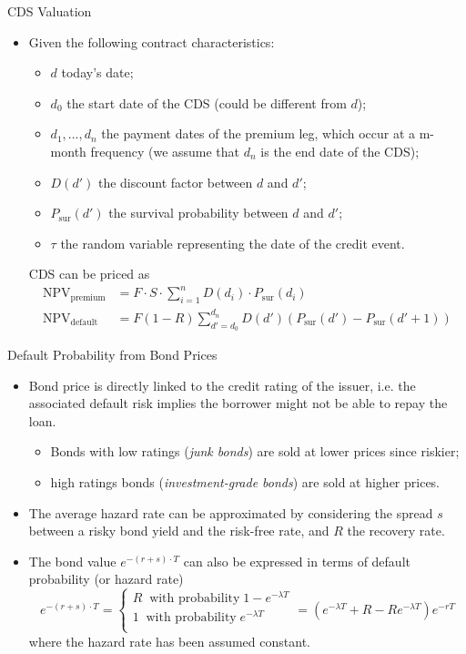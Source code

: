 \documentclass{beamer}
\begin{document}
\begin{frame}{CDS Valuation}
\begin{itemize}
\item Given the following contract characteristics:
\begin{itemize}
\item $d$ today's date;
\item $d_0$ the start date of the CDS (could be different from $d$);
\item $d_1, ..., d_n$ the payment dates of the premium leg, which occur at a m-month frequency (we assume that $d_n$ is the end date of the CDS);
\item $D(d')$ the discount factor between $d$ and $d'$;
\item $P_{\textrm{sur}}(d')$ the survival probability between $d$ and $d'$;
\item $\tau$ the random variable representing the date of the credit event.
\end{itemize}
CDS can be priced as
\begin{align*}
\textrm{NPV}_{\textrm{premium}} &= F\cdot S\cdot \sum_{i=1}^{n} D(d_i) \cdot P_{\textrm{sur}}(d_i) \\
\mathrm{NPV_{default}} &= F(1-R) \sum_{d'=d_0}^{d_n} D(d') \left( P_{\textrm{sur}}(d') - P_{\textrm{sur}}(d'+1) \right)
\end{align*}
\end{itemize}
\end{frame}

\begin{frame}{Default Probability from Bond Prices}
\begin{itemize}
\item Bond price is directly linked to the credit rating of the issuer, i.e. the associated default risk implies the borrower might not be able to repay the loan.
\begin{itemize}
    \item Bonds with low ratings (\emph{junk bonds}) are sold at lower prices since riskier;
    \item high ratings bonds (\emph{investment-grade bonds}) are sold at higher prices.
\end{itemize}
\item The average hazard rate can be approximated by considering the spread $s$ between a risky bond yield and the risk-free rate, and $R$ the recovery rate. 
\item The bond value $e^{-(r+s)\cdot T}$ can also be expressed in terms of default probability (or hazard rate)
\begin{equation*}
e^{-(r+s)\cdot T} = 
\begin{cases}
R\;\;\textrm{with probability}\;1 - e^{-\lambda T} \\
1\;\;\textrm{with probability}\;e^{-\lambda T} \\
\end{cases} = 
(e^{-\lambda T} + R - R e^{-\lambda T})e^{-rT}
\end{equation*}
where the hazard rate has been assumed constant.
\end{itemize}
\end{frame}
\end{document}
